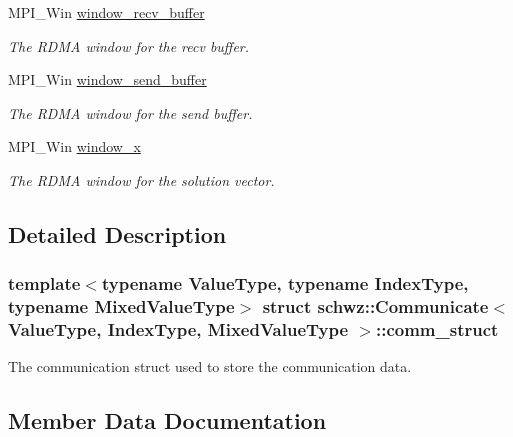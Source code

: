 \begin{DoxyCompactItemize}
M\+P\+I\+\_\+\+Win \hyperlink{structschwz_1_1Communicate_1_1comm__struct_a6257c71a7ebf30ecfc390059ceef0e1f}{window\+\_\+recv\+\_\+buffer}
\begin{DoxyCompactList}\small\item\em The R\+D\+MA window for the recv buffer. \end{DoxyCompactList}\item 
\mbox{\label{structschwz_1_1Communicate_1_1comm__struct_af2c5d4bfea8073b2c885eec175b92416}} 
M\+P\+I\+\_\+\+Win \hyperlink{structschwz_1_1Communicate_1_1comm__struct_af2c5d4bfea8073b2c885eec175b92416}{window\+\_\+send\+\_\+buffer}
\begin{DoxyCompactList}\small\item\em The R\+D\+MA window for the send buffer. \end{DoxyCompactList}\item 
\mbox{\label{structschwz_1_1Communicate_1_1comm__struct_a5da0c24baf9d9955d764fe4b3274a982}} 
M\+P\+I\+\_\+\+Win \hyperlink{structschwz_1_1Communicate_1_1comm__struct_a5da0c24baf9d9955d764fe4b3274a982}{window\+\_\+x}
\begin{DoxyCompactList}\small\item\em The R\+D\+MA window for the solution vector. \end{DoxyCompactList}\end{DoxyCompactItemize}


\subsection{Detailed Description}
\subsubsection*{template$<$typename Value\+Type, typename Index\+Type, typename Mixed\+Value\+Type$>$\newline
struct schwz\+::\+Communicate$<$ Value\+Type, Index\+Type, Mixed\+Value\+Type $>$\+::comm\+\_\+struct}

The communication struct used to store the communication data. 

\subsection{Member Data Documentation}
\mbox{\label{structschwz_1_1Communicate_1_1comm__struct_a4166e2bb75eeaf48ee39ca7cdc3adb01}} 
